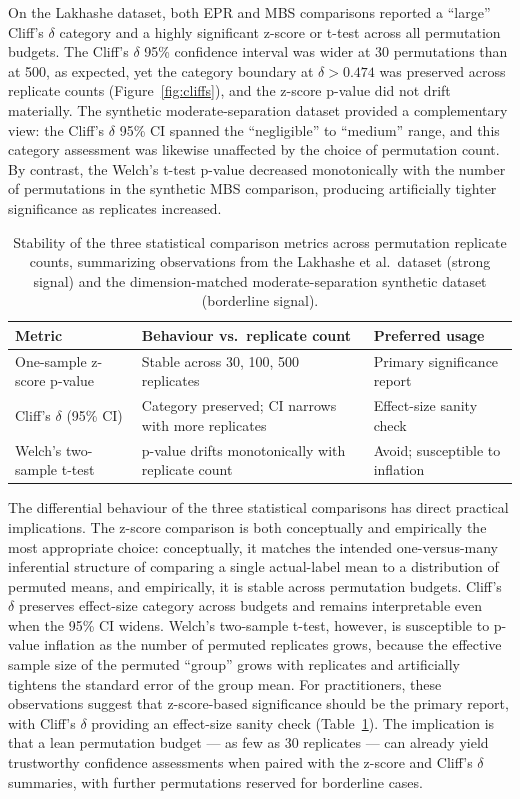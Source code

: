 \documentclass[11pt]{article}
\begin{document}
On the Lakhashe dataset, both EPR and MBS comparisons reported a ``large'' Cliff's $\delta$ category and a highly significant z-score or t-test across all permutation budgets. The Cliff's $\delta$ 95\% confidence interval was wider at 30 permutations than at 500, as expected, yet the category boundary at $\delta > 0.474$ was preserved across replicate counts (Figure~\ref{fig:cliffs}), and the z-score p-value did not drift materially. The synthetic moderate-separation dataset provided a complementary view: the Cliff's $\delta$ 95\% CI spanned the ``negligible'' to ``medium'' range, and this category assessment was likewise unaffected by the choice of permutation count. By contrast, the Welch's t-test p-value decreased monotonically with the number of permutations in the synthetic MBS comparison, producing artificially tighter significance as replicates increased.

\begin{table}[htbp]
\centering
\caption{Stability of the three statistical comparison metrics across permutation replicate counts, summarizing observations from the Lakhashe et al.\ dataset (strong signal) and the dimension-matched moderate-separation synthetic dataset (borderline signal).}
\label{tab:perm_stability}
\begin{tabular}{lll}
\toprule
Metric & Behaviour vs.\ replicate count & Preferred usage \\
\midrule
One-sample z-score p-value     & Stable across 30, 100, 500 replicates   & Primary significance report \\
Cliff's $\delta$ (95\% CI)      & Category preserved; CI narrows with more replicates & Effect-size sanity check \\
Welch's two-sample t-test      & p-value drifts monotonically with replicate count & Avoid; susceptible to inflation \\
\bottomrule
\end{tabular}
\end{table}

The differential behaviour of the three statistical comparisons has direct practical implications. The z-score comparison is both conceptually and empirically the most appropriate choice: conceptually, it matches the intended one-versus-many inferential structure of comparing a single actual-label mean to a distribution of permuted means, and empirically, it is stable across permutation budgets. Cliff's $\delta$ preserves effect-size category across budgets and remains interpretable even when the 95\% CI widens. Welch's two-sample t-test, however, is susceptible to p-value inflation as the number of permuted replicates grows, because the effective sample size of the permuted ``group'' grows with replicates and artificially tightens the standard error of the group mean. For practitioners, these observations suggest that z-score-based significance should be the primary report, with Cliff's $\delta$ providing an effect-size sanity check (Table~\ref{tab:perm_stability}). The implication is that a lean permutation budget --- as few as 30 replicates --- can already yield trustworthy confidence assessments when paired with the z-score and Cliff's $\delta$ summaries, with further permutations reserved for borderline cases.
\end{document}
